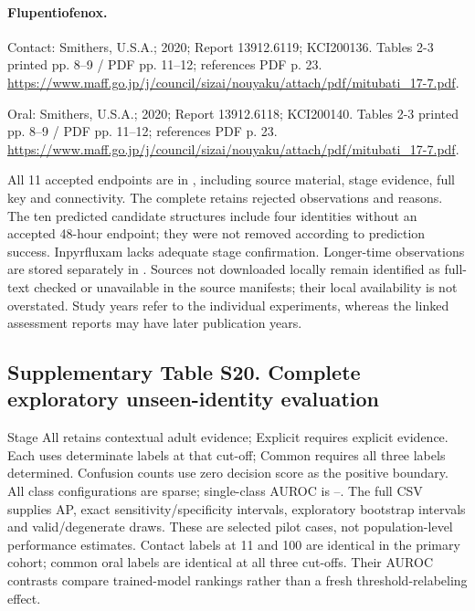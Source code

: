 \paragraph{Flupentiofenox.}

Contact: Smithers, U.S.A.; 2020; Report 13912.6119; KCI200136. Tables 2-3 printed pp. 8--9 / PDF pp. 11--12; references PDF p. 23. \url{https://www.maff.go.jp/j/council/sizai/nouyaku/attach/pdf/mitubati_17-7.pdf}.

Oral: Smithers, U.S.A.; 2020; Report 13912.6118; KCI200140. Tables 2-3 printed pp. 8--9 / PDF pp. 11--12; references PDF p. 23. \url{https://www.maff.go.jp/j/council/sizai/nouyaku/attach/pdf/mitubati_17-7.pdf}.

All 11 accepted endpoints are in , including source material, stage evidence, full key and connectivity. The complete  retains rejected observations and reasons. The ten predicted candidate structures include four identities without an accepted 48-hour endpoint; they were not removed according to prediction success. Inpyrfluxam lacks adequate stage confirmation. Longer-time observations are stored separately in . Sources not downloaded locally remain identified as full-text checked or unavailable in the source manifests; their local availability is not overstated. Study years refer to the individual experiments, whereas the linked assessment reports may have later publication years.

\subsection*{Supplementary Table S20. Complete exploratory unseen-identity evaluation}

Stage All retains contextual adult evidence; Explicit requires explicit evidence. Each uses determinate labels at that cut-off; Common requires all three labels determined. Confusion counts use zero decision score as the positive boundary. All class configurations are sparse; single-class AUROC is --. The full CSV supplies AP, exact sensitivity/specificity intervals, exploratory bootstrap intervals and valid/degenerate draws. These are selected pilot cases, not population-level performance estimates. Contact labels at 11 and 100 are identical in the primary cohort; common oral labels are identical at all three cut-offs. Their AUROC contrasts compare trained-model rankings rather than a fresh threshold-relabeling effect.

